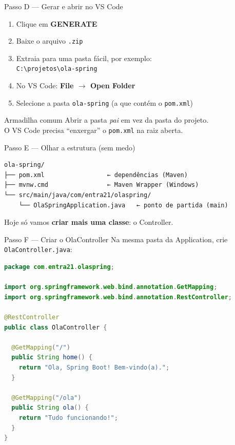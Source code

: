 \documentclass[aspectratio=169,11pt]{beamer}
\begin{document}
\begin{frame}{Passo D --- Gerar e abrir no VS Code}
  \begin{enumerate}
    \item Clique em \textbf{GENERATE}
    \item Baixe o arquivo \texttt{.zip}
    \item Extraia para uma pasta fácil, por exemplo:\\
          \texttt{C:\textbackslash{}projetos\textbackslash{}ola-spring}
    \item No VS Code: \textbf{File $\rightarrow$ Open Folder}
    \item Selecione a pasta \texttt{ola-spring} (a que contém o \texttt{pom.xml})
  \end{enumerate}

  \vspace{0.5em}
  \begin{block}{Armadilha comum}
    Abrir a pasta \emph{pai} em vez da pasta do projeto.\\
    O VS Code precisa “enxergar” o \texttt{pom.xml} na raiz aberta.
  \end{block}
\end{frame}

\begin{frame}[fragile]{Passo E --- Olhar a estrutura (sem medo)}
\begin{lstlisting}[basicstyle=\ttfamily\scriptsize]
ola-spring/
├── pom.xml                 ← dependências (Maven)
├── mvnw.cmd                ← Maven Wrapper (Windows)
└── src/main/java/com/entra21/olaspring/
    └── OlaSpringApplication.java   ← ponto de partida (main)
\end{lstlisting}

  \vspace{0.5em}
  Hoje só vamos \textbf{criar mais uma classe}: o Controller.
\end{frame}

\begin{frame}[fragile]{Passo F --- Criar o OlaController}
  Na mesma pasta da Application, crie \texttt{OlaController.java}:

\begin{lstlisting}[language=Java,basicstyle=\ttfamily\footnotesize]
package com.entra21.olaspring;

import org.springframework.web.bind.annotation.GetMapping;
import org.springframework.web.bind.annotation.RestController;

@RestController
public class OlaController {

  @GetMapping("/")
  public String home() {
    return "Ola, Spring Boot! Bem-vindo(a).";
  }

  @GetMapping("/ola")
  public String ola() {
    return "Tudo funcionando!";
  }
}
\end{lstlisting}
\end{frame}
\end{document}

